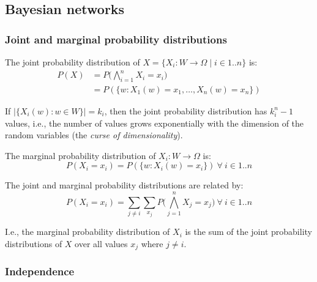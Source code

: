 \subsection{Bayesian networks}

\subsubsection{Joint and marginal probability distributions}

\begin{dfn}
  The joint probability distribution of
  ${X = \{ X_i : W \to \Omega \mid i \in 1 .. n \}}$ is:
  \begin{align}
    P(X) & = P \bigl( \bigwedge_{i = 1}^{n} X_i = x_i \bigr) \nonumber
    \\
         & = P(\{
    w : X_1(w) = x_1, \ldots, X_n(w) = x_n \})
  \end{align}
\end{dfn}

If $|\{ X_i(w) : w \in W \}| = k_i$, then the joint
probability distribution has $k_i^n - 1$ values, i.e., the number of values
grows exponentially with the dimension of the random variables (the
\textit{curse of dimensionality}).

\begin{dfn}
  The marginal probability distribution of $X_i : W \to \Omega$ is:
  \begin{equation}
    P(X_i = x_i) = P(\{ w : X_i(w) = x_i \})
    \ \forall\
    i \in 1 .. n
  \end{equation}
\end{dfn}

\begin{thm}
  The joint and marginal probability distributions are related by:
  \begin{equation}
    P(X_i = x_i) = \sum_{j \neq i} \sum_{x_j} P \bigl( \bigwedge_{j = 1}^{n} X_j =
    x_j \bigr) \ \forall\ i \in 1 .. n
  \end{equation}
\end{thm}

I.e., the marginal probability distribution of $X_i$ is the sum of the joint
probability distributions of $X$ over all values $x_j$ where $j \neq i$.

\subsubsection{Independence}

